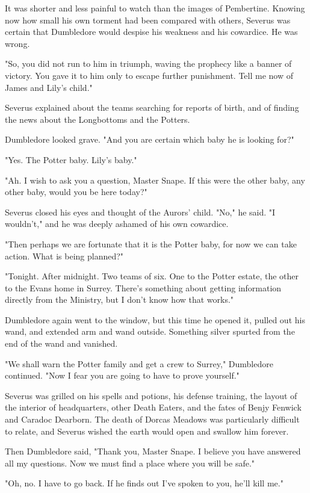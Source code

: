 It was shorter and less painful to watch than the images of Pembertine. Knowing now how small his own torment had been compared with others, Severus was certain that Dumbledore would despise his weakness and his cowardice. He was wrong.

"So, you did not run to him in triumph, waving the prophecy like a banner of victory. You gave it to him only to escape further punishment. Tell me now of James and Lily's child."

Severus explained about the teams searching for reports of birth, and of finding the news about the Longbottoms and the Potters.

Dumbledore looked grave. "And you are certain which baby he is looking for?"

"Yes. The Potter baby. Lily's baby."

"Ah. I wish to ask you a question, Master Snape. If this were the other baby, any other baby, would you be here today?"

Severus closed his eyes and thought of the Aurors' child. "No," he said. "I wouldn't," and he was deeply ashamed of his own cowardice.

"Then perhaps we are fortunate that it is the Potter baby, for now we can take action. What is being planned?"

"Tonight. After midnight. Two teams of six. One to the Potter estate, the other to the Evans home in Surrey. There's something about getting information directly from the Ministry, but I don't know how that works."

Dumbledore again went to the window, but this time he opened it, pulled out his wand, and extended arm and wand outside. Something silver spurted from the end of the wand and vanished.

"We shall warn the Potter family and get a crew to Surrey," Dumbledore continued. "Now I fear you are going to have to prove yourself."

Severus was grilled on his spells and potions, his defense training, the layout of the interior of headquarters, other Death Eaters, and the fates of Benjy Fenwick and Caradoc Dearborn. The death of Dorcas Meadows was particularly difficult to relate, and Severus wished the earth would open and swallow him forever.

Then Dumbledore said, "Thank you, Master Snape. I believe you have answered all my questions. Now we must find a place where you will be safe."

"Oh, no. I have to go back. If he finds out I've spoken to you, he'll kill me."

